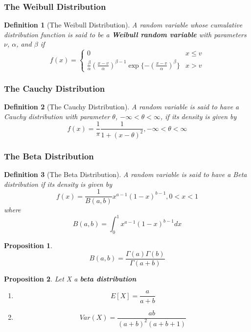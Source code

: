 \documentclass[12pt]{article}
\newtheorem{definition}{Definition}[subsection]
\newtheorem{proposition}{Proposition}[subsection]
\begin{document}
    \subsubsection{The Weibull Distribution}
    \begin{definition}[The Weibull Distribution]
        A random variable whose cumulative distribution function is said to be a \textbf{Weibull random variable} with parameters $\nu$, $\alpha$, and $\beta$ if
        \[f(x) = \left\{ \begin{array}{ll} 0 & x \leq v\\ \frac{\beta}{\alpha}(\frac{x-v}{\alpha})^{\beta-1}\exp\{-(\frac{x-v}{\alpha})^{\beta}\}& x > v\end{array}\right.\]
    \end{definition}
    \subsubsection{The Cauchy Distribution}
    \begin{definition}[The Cauchy Distribution]
        A random variable is said to have a Cauchy distribution with parameter $\theta$, $-\infty < \theta < \infty$, if its density is given by
        \[f(x) = \frac{1}{\pi}\frac{1}{1+(x-\theta)^2}, -\infty < \theta < \infty\]
    \end{definition}
    \subsubsection{The Beta Distribution}
    \begin{definition}[The Beta Distribution]
        A random variable is said to have a Beta distribution if its density is given by
        \[f(x) = \frac{1}{B(a,b)}x^{a-1}(1-x)^{b-1}, 0 < x < 1\]
        where
        \[B(a, b) = \int^1_0 x^{a-1}(1-x)^{b-1}dx\]
    \end{definition}
    \begin{proposition}
        \[B(a,b) = \frac{\Gamma(a)\Gamma(b)}{\Gamma(a+b)}\]
    \end{proposition}
    \begin{proposition}
    Let X a \textbf{beta distribution}
        \begin{enumerate}
            \item \[E[X] = \frac{a}{a+b}\]
            \item \[Var(X) = \frac{ab}{(a+b)^2(a+b+1)}\]
        \end{enumerate}
    \end{proposition}
\end{document}
